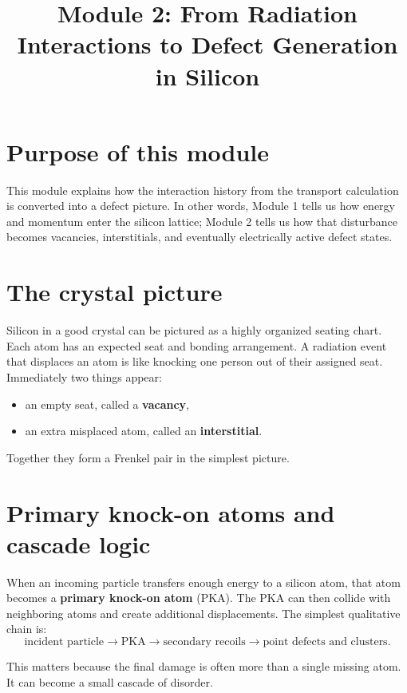 \documentclass[11pt]{article}
\begin{document}
\title{Module 2: From Radiation Interactions to Defect Generation in Silicon}
\author{}
\date{}
\maketitle

\section{Purpose of this module}
This module explains how the interaction history from the transport calculation is converted into a defect picture. In other words, Module 1 tells us how energy and momentum enter the silicon lattice; Module 2 tells us how that disturbance becomes vacancies, interstitials, and eventually electrically active defect states.

\section{The crystal picture}
Silicon in a good crystal can be pictured as a highly organized seating chart. Each atom has an expected seat and bonding arrangement. A radiation event that displaces an atom is like knocking one person out of their assigned seat. Immediately two things appear:
\begin{itemize}
    \item an empty seat, called a \textbf{vacancy},
    \item an extra misplaced atom, called an \textbf{interstitial}.
\end{itemize}
Together they form a Frenkel pair in the simplest picture.

\section{Primary knock-on atoms and cascade logic}
When an incoming particle transfers enough energy to a silicon atom, that atom becomes a \textbf{primary knock-on atom} (PKA). The PKA can then collide with neighboring atoms and create additional displacements. The simplest qualitative chain is:
\begin{equation}
\text{incident particle} \to \text{PKA} \to \text{secondary recoils} \to \text{point defects and clusters}.
\end{equation}

This matters because the final damage is often more than a single missing atom. It can become a small cascade of disorder.
\end{document}

